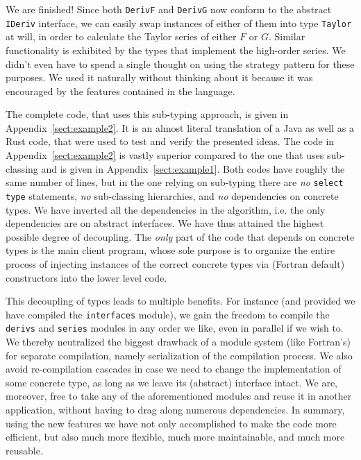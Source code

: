 \documentclass[11pt,oneside]{article}
\begin{document}
We are finished! Since both \texttt{DerivF} and \texttt{DerivG} now
conform to the abstract \texttt{IDeriv} interface, we can easily swap
instances of either of them into type \texttt{Taylor} at will, in
order to calculate the Taylor series of either $F$ or $G$. Similar
functionality is exhibited by the types that implement the high-order
series. We didn't even have to spend a single thought on using the
strategy pattern for these purposes. We used it naturally without
thinking about it because it was encouraged by the features contained
in the language.

The complete code, that uses this sub-typing approach, is given in
Appendix~\ref{sect:example2}. It is an almost literal translation of a
Java as well as a Rust code, that were used to test and verify the
presented ideas. The code in Appendix~\ref{sect:example2} is vastly
superior compared to the one that uses sub-classing and is given in
Appendix~\ref{sect:example1}. Both codes have roughly the same number
of lines, but in the one relying on sub-typing there are \emph{no}
\texttt{select type} statements, \emph{no} sub-classing hierarchies,
and \emph{no} dependencies on concrete types. We have inverted all the
dependencies in the algorithm, i.e. the only dependencies are on
abstract interfaces. We have thus attained the highest possible degree
of decoupling. The \emph{only} part of the code that depends on
concrete types is the main client program, whose sole purpose is to
organize the entire process of injecting instances of the correct
concrete types via (Fortran default) constructors into the lower level
code.

This decoupling of types leads to multiple benefits. For instance (and
provided we have compiled the \texttt{interfaces} module), we gain the
freedom to compile the \texttt{derivs} and \texttt{series} modules in
any order we like, even in parallel if we wish to. We thereby
neutralized the biggest drawback of a module system (like Fortran's)
for separate compilation, namely serialization of the compilation
process. We also avoid re-compilation cascades in case we need to
change the implementation of some concrete type, as long as we leave
its (abstract) interface intact. We are, moreover, free to take any of
the aforementioned modules and reuse it in another application,
without having to drag along numerous dependencies. In summary, using
the new features we have not only accomplished to make the code more
efficient, but also much more flexible, much more maintainable, and
much more reusable.
\end{document}
